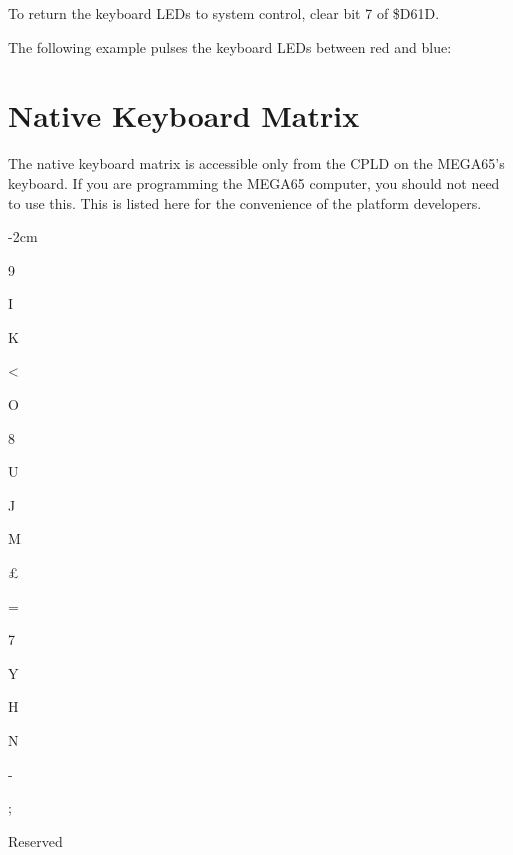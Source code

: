 To return the keyboard LEDs to system control, clear bit 7 of \$D61D.

The following example pulses the keyboard LEDs between red and blue:



\newpage
\section{Native Keyboard Matrix}

The native keyboard matrix is accessible only from the CPLD on the MEGA65's keyboard. If you are programming the MEGA65 computer, you should not need to use this. This is listed here for the convenience of the platform developers.

\begin{adjustwidth}{}{-2cm}
\begin{multicols}{2}
\begin{description}[align=left,labelwidth=0.2cm]
    \item [0] 
    \item [1] 9
    \item [2] I
    \item [3] K
    \item [4] <
    \item [5] 
    \item [6] 
    \item [7] O
    \item [8] 
    \item [9] 8
    \item [10] U
    \item [11] J
    \item [12] M
    \item [13] \megakey{$\rightarrow$}
    \item [14] \pounds
    \item [15] =
    \item [16] 
    \item [17] 7
    \item [18] Y
    \item [19] H
    \item [20] N
    \item [21] \megakey{$\downarrow$}
    \item [22] -
    \item [23] ;
    \item [24] Reserved

\end{description}
\end{multicols}
\end{adjustwidth}
